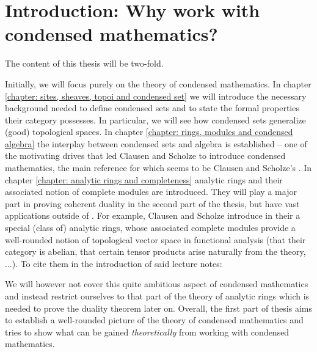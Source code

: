  
\section*{Introduction: Why work with condensed mathematics?}

The content of this thesis will be two-fold.

Initially, we will focus purely on the theory of condensed mathematics. In chapter \ref{chapter: sites, sheaves, topoi and condensed set} we will introduce the necessary background needed to define condensed sets and to state the formal properties their category possesses. In particular, we will see how condensed sets generalize (good) topological spaces. In chapter \ref{chapter: rings, modules and condensed algebra} the interplay between condensed sets and algebra is established -- one of the motivating drives that led Clausen and Scholze to introduce condensed mathematics, the main reference for which seems to be Clausen and Scholze's \cite[lecture notes]{condenseddotpdf}. In chapter \ref{chapter: analytic rings and completeness} analytic rings and their associated notion of complete modules are introduced. They will play a major part in proving coherent duality in the second part of the thesis, but have vast applications outside of . For example, Clausen and Scholze introduce in their \cite[Lectures on Analytic Geometry]{analyticdotpdf} a special (class of) analytic rings, whose associated complete modules provide a well-rounded notion of topological vector space in functional analysis (\eg that their category is abelian, that certain tensor products arise naturally from the theory, ...). To cite them in the introduction of said lecture notes:


We will however not cover this quite ambitious aspect of condensed mathematics and instead restrict ourselves to that part of the theory of analytic rings which is needed to prove the duality theorem later on. Overall, the first part of thesis aims to establish a well-rounded picture of the theory of condensed mathematics and tries to show what can be gained \emph{theoretically} from working with condensed mathematics.

